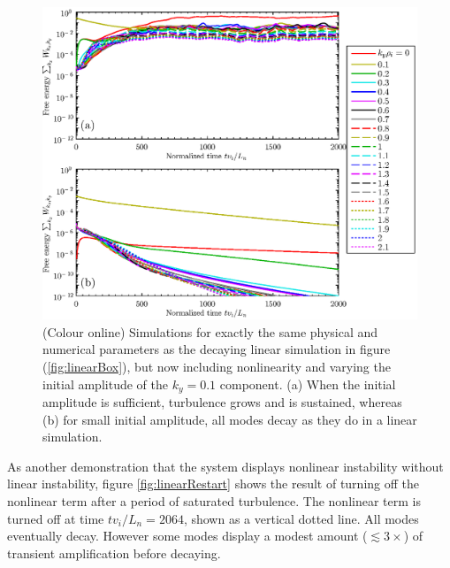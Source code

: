 \documentclass{jpp}
\begin{document}
\begin{figure}
\centerline{\includegraphics[width=6.5in]{fig7.eps}}
\caption{(Colour online)
Simulations for exactly the same physical and numerical parameters as the decaying
linear simulation in figure (\ref{fig:linearBox}), but now including nonlinearity and varying the
initial amplitude of the $k_y=0.1$ component.
(a) When the initial amplitude is sufficient, turbulence grows and is sustained, whereas (b) for small initial amplitude,
all modes decay as they do in a linear simulation.
\label{fig:amplitudeDependence}}
\end{figure}

As another demonstration that the system displays nonlinear instability without linear instability,
figure \ref{fig:linearRestart} shows the result of
turning off the nonlinear term after a period of saturated turbulence.
The nonlinear term is turned off at time $t v_i / L_n = 2064$, shown as a vertical
dotted line.  All modes eventually decay.
However some modes
display a modest amount ($\lesssim 3\times$) of transient amplification before decaying.
\end{document}
